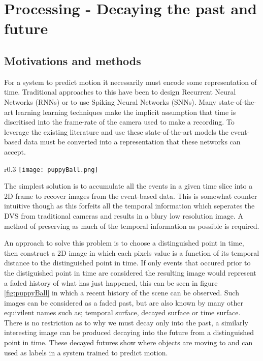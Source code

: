 \chapter{Processing - Decaying the past and future}
\label{ch:preprocess}

\section{Motivations and methods}
For a system to predict motion it necessarily must encode some representation of time. 
Traditional approaches to this have been to design Recurrent Neural Networks (RNNs) or to use Spiking Neural Networks (SNNs). 
Many state-of-the-art learning learning techniques make the implicit assumption that time is discritised into the frame-rate of the camera used to make a recording. 
To leverage the existing literature and use these state-of-the-art models the event-based data must be converted into a representation that these networks can accept. 

\begin{wrapfigure}{r}{0.3\textwidth}
    \centering
    \label{fig:puppyBall}
    \texttt{[image: puppyBall.png]}
    \caption{A decayed image of a puppy with a ball}
\end{wrapfigure}
The simplest solution is to accumulate all the events in a given time slice into a 2D frame to recover images from the event-based data.
This is somewhat counter intuitive though as this forfeits all the temporal information which seperates the DVS from traditional cameras and results in a blury low resolution image. 
A method of preserving as much of the temporal information as possible is required. 


An approach to solve this problem is to choose a distinguished point in time, then construct a 2D image in which each pixels value is a function of its temporal distance to the distinguished point in time.
If only events that occured prior to the distiguished point in time are considered the resulting image would represent a faded history of what has just happened, this can be seen in figure \ref{fig:puppyBall} in which a recent history of the scene can be observed. 
Such images can be considered as a faded past, but are also known by many other equivilent names such as; temporal surface, decayed surface or time surface. 
There is no restriction as to why we must decay only into the past, a similarly interesting image can be produced decaying into the future from a distinguished point in time.
These decayed futures show where objects are moving to and can used as labels in a system trained to predict motion. 


